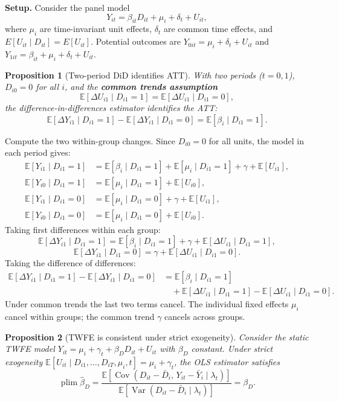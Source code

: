 \documentclass[12pt,a4paper]{article}
\theoremstyle{plain}
\newtheorem{propositio}{Proposition}[section]
\theoremstyle{definition}
\renewenvironment{proof}{\pushQED{\qed}\normalfont}{\popQED\par\nobreak}
\newcommand{\E}{\mathbb{E}}
\newcommand{\Cov}{\operatorname{Cov}}
\newcommand{\Var}{\operatorname{Var}}
\newcommand{\plim}{\operatorname{plim}}
\begin{document}
\noindent\textbf{Setup.}
Consider the panel model
\[
  Y_{it} = \beta_{it}D_{it} + \mu_i + \delta_t + U_{it},
\]
where $\mu_i$ are time-invariant unit effects, $\delta_t$ are common time effects, and $E[U_{it}\mid D_{it}]=E[U_{it}]$.  Potential outcomes are $Y_{0it}=\mu_i+\delta_t+U_{it}$ and $Y_{1it}=\beta_{it}+\mu_i+\delta_t+U_{it}$.

\begin{propositio}[Two-period DiD identifies ATT\label{prop:did_att}]
With two periods ($t=0,1$), $D_{i0}=0$ for all $i$, and the \textbf{common trends assumption}
\[
  \E[\Delta U_{i1}\mid D_{i1}=1] = \E[\Delta U_{i1}\mid D_{i1}=0],
\]
the difference-in-differences estimator identifies the ATT:
\[
  \E[\Delta Y_{i1}\mid D_{i1}=1]-\E[\Delta Y_{i1}\mid D_{i1}=0]
  = \E[\beta_{i}\mid D_{i1}=1].
\]
\end{propositio}

\begin{proof}
Compute the two within-group changes.  Since $D_{i0}=0$ for all units, the model in each period gives:
\begin{align*}
  \E[Y_{i1}\mid D_{i1}=1] &= \E[\beta_i\mid D_{i1}=1]+\E[\mu_i\mid D_{i1}=1]+\gamma+\E[U_{i1}],\\
  \E[Y_{i0}\mid D_{i1}=1] &= \E[\mu_i\mid D_{i1}=1]+\E[U_{i0}],\\
  \E[Y_{i1}\mid D_{i1}=0] &= \E[\mu_i\mid D_{i1}=0]+\gamma+\E[U_{i1}],\\
  \E[Y_{i0}\mid D_{i1}=0] &= \E[\mu_i\mid D_{i1}=0]+\E[U_{i0}].
\end{align*}
Taking first differences within each group:
\[
  \E[\Delta Y_{i1}\mid D_{i1}=1]
  = \E[\beta_i\mid D_{i1}=1]+\gamma+\E[\Delta U_{i1}\mid D_{i1}=1],
\]
\[
  \E[\Delta Y_{i1}\mid D_{i1}=0]
  = \gamma+\E[\Delta U_{i1}\mid D_{i1}=0].
\]
Taking the difference of differences:
\begin{align*}
  \E[\Delta Y_{i1}\mid D_{i1}=1]-\E[\Delta Y_{i1}\mid D_{i1}=0]
  &= \E[\beta_i\mid D_{i1}=1]\\
  &\quad + \E[\Delta U_{i1}\mid D_{i1}=1]-\E[\Delta U_{i1}\mid D_{i1}=0].
\end{align*}
Under common trends the last two terms cancel.
The individual fixed effects $\mu_i$ cancel within groups; the common trend $\gamma$ cancels across groups.
\end{proof}

\begin{propositio}[TWFE is consistent under strict exogeneity\label{prop:twfe}]
Consider the static TWFE model $Y_{it}=\mu_i+\gamma_t+\beta_D D_{it}+U_{it}$ with $\beta_D$ constant.
Under strict exogeneity $\E[U_{it}\mid D_{i1},\ldots,D_{iT},\mu_i,t]=\mu_i+\gamma_t$, the OLS estimator satisfies
\[
  \plim\hat\beta_D
  = \frac{\E[\Cov(D_{it}-\bar D_i,\, Y_{it}-\bar Y_i\mid\lambda_t)]}
         {\E[\Var(D_{it}-\bar D_i\mid\lambda_t)]}
  = \beta_D.
\]
\end{propositio}
\end{document}
